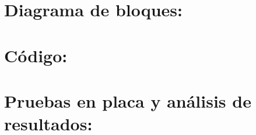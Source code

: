 \documentclass[a4paper,11pt]{article} %
\begin{document}
    \section{Diagrama de bloques:} \label{section:DiagBloques}
    
        
    \section{Código:} \label{section:Codigo}
    
    
    \section{Pruebas en placa y análisis de resultados:} \label{section:PruebasYResultados}

    

    \newpage
    \listoffigures
	\listoftables
	
\end{document}
